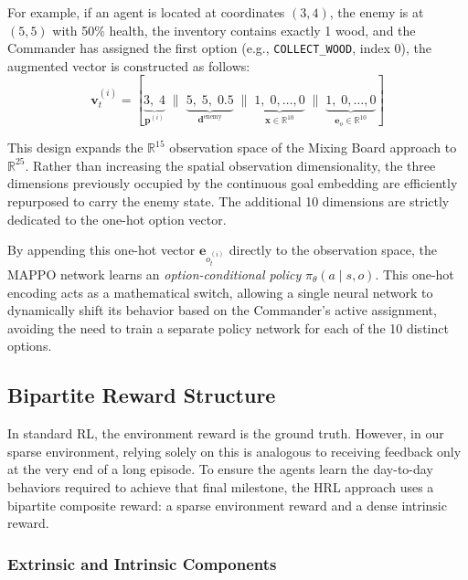 For example, if an agent is located at coordinates $(3, 4)$, the enemy is at $(5, 5)$ with 50\% health, the inventory contains exactly 1 wood, and the Commander has assigned the first option (e.g., \texttt{COLLECT\_WOOD}, index 0), the augmented vector is constructed as follows:
\begin{equation}
    \mathbf{v}_t^{(i)}
    =
    \left[
        \underbrace{3,\; 4}_{\mathbf{p}^{(i)}}
        \;\Big\|\;
        \underbrace{5,\; 5,\; 0.5}_{\mathbf{d}^{\text{enemy}}}
        \;\Big\|\;
        \underbrace{1,\; 0,\dots, 0}_{\mathbf{x} \in \mathbb{R}^{10}}
        \;\Big\|\;
        \underbrace{1,\; 0,\dots, 0}_{\mathbf{e}_o \in \mathbb{R}^{10}}
    \right]
\end{equation}

This design expands the $\mathbb{R}^{15}$ observation space of the Mixing Board approach to $\mathbb{R}^{25}$. Rather than increasing the spatial observation dimensionality, the three dimensions previously occupied by the continuous goal embedding are efficiently repurposed to carry the enemy state. The additional 10 dimensions are strictly dedicated to the one-hot option vector.

By appending this one-hot vector $\mathbf{e}_{o_t^{(i)}}$ directly to the observation space, the MAPPO network learns an \emph{option-conditional policy} $\pi_\theta(a \mid s, o)$. This one-hot encoding acts as a mathematical switch, allowing a single neural network to dynamically shift its behavior based on the Commander's active assignment, avoiding the need to train a separate policy network for each of the 10 distinct options.

\subsection{Bipartite Reward Structure}
\label{sec:bipartite_reward}

In standard RL, the environment reward is the ground truth. However, in our sparse environment, relying solely on this is analogous to receiving feedback only at the very end of a long episode. To ensure the agents learn the day-to-day behaviors required to achieve that final milestone, the HRL approach uses a bipartite composite reward: a sparse environment reward and a dense intrinsic reward.

\subsubsection{Extrinsic and Intrinsic Components}
\label{sec:intrinsic_reward}

